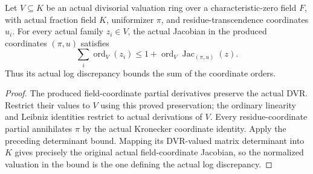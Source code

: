 \begin{theorem}\label{thm:sc0-actual-dvr-logarithmic-jacobian}
\leanok
{}
Let $V\subseteq K$ be an actual divisorial valuation ring over a
characteristic-zero field $F$, with actual fraction field $K$, uniformizer
$\pi$, and residue-transcendence coordinates $u_i$. For every actual family
$z_i\in V$, the actual Jacobian in the produced coordinates $(\pi,u)$ satisfies
\[
 \sum_i\operatorname{ord}_V(z_i)\le
 1+\operatorname{ord}_V\operatorname{Jac}_{(\pi,u)}(z).
\]
Thus its actual log discrepancy bounds the sum of the coordinate orders.
\end{theorem}
\begin{proof}
The produced field-coordinate partial derivatives preserve the actual DVR.
Restrict their values to $V$ using this proved preservation; the ordinary
linearity and Leibniz identities restrict to actual derivations of $V$.
Every residue-coordinate partial annihilates $\pi$ by the actual Kronecker
coordinate identity. Apply the preceding determinant bound. Mapping its
DVR-valued matrix determinant into $K$ gives precisely the original actual
field-coordinate Jacobian, so the normalized valuation in the bound is the
one defining the actual log discrepancy.
\end{proof}
